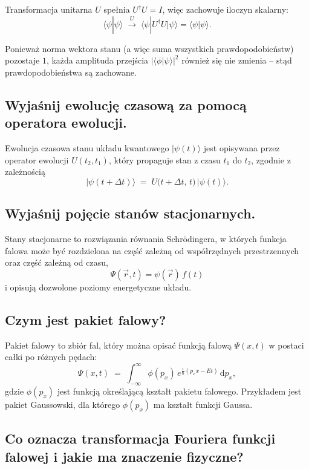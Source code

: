 Transformacja unitarna $U$ spełnia $U^\dagger U = I$, więc zachowuje iloczyn skalarny:
\[
\langle \psi | \psi \rangle
\;\xrightarrow{\,U\,}\;
\langle \psi | U^\dagger U | \psi \rangle
= \langle \psi | \psi \rangle.
\]

Ponieważ norma wektora stanu (a więc suma wszystkich prawdopodobieństw) pozostaje $1$, każda amplituda przejścia 
$|\langle \phi | \psi \rangle|^{2}$ również się nie zmienia – stąd prawdopodobieństwa są zachowane.

\subsection{Wyjaśnij ewolucję czasową za pomocą operatora ewolucji.}

Ewolucja czasowa stanu układu kwantowego \(\lvert \psi(t) \rangle\) jest opisywana przez operator ewolucji \(U(t_{2},t_{1})\), który propaguje stan z czasu \(t_{1}\) do \(t_{2}\), zgodnie z zależnością
\[
\lvert \psi(t+\Delta t) \rangle \;=\; U\bigl(t+\Delta t,\,t\bigr)\,\lvert \psi(t) \rangle.
\]

\subsection{Wyjaśnij pojęcie stanów stacjonarnych.}

Stany stacjonarne to rozwiązania równania Schrödingera, w których funkcja falowa może być rozdzielona na część zależną od współrzędnych przestrzennych oraz część zależną od czasu,
\[
\Psi(\vec r, t) = \psi(\vec r)\,f(t)
\]
i opisują dozwolone poziomy energetyczne układu.

\subsection{Czym jest pakiet falowy?}

Pakiet falowy to zbiór fal, który można opisać funkcją falową \(\Psi(x,t)\) w postaci całki po różnych pędach:
\[
\Psi(x,t)\;=\;\int_{-\infty}^{\infty}\!\phi(p_x)\,e^{\tfrac{i}{\hbar}(p_x x - E t)}\,\mathrm{d}p_x,
\]
gdzie \(\phi(p_x)\) jest funkcją określającą kształt pakietu falowego.  
Przykładem jest pakiet Gaussowski, dla którego \(\phi(p_x)\) ma kształt funkcji Gaussa.

\subsection{Co oznacza transformacja Fouriera funkcji falowej i jakie ma znaczenie fizyczne?}

